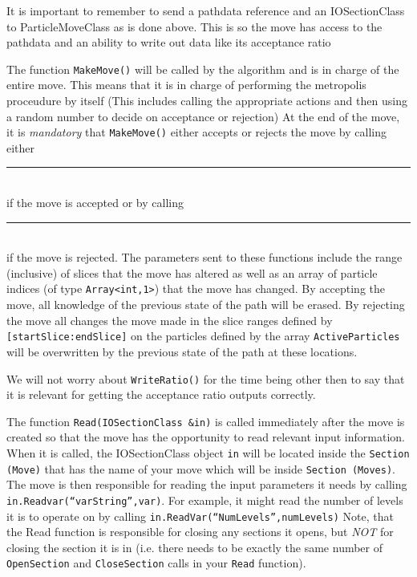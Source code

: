 \documentclass{book}
\begin{document}
It is important to remember to send a pathdata reference and an
  IOSectionClass to ParticleMoveClass as is done above. This is so the
  move has access to the pathdata and an ability to write out data
  like its acceptance ratio

The function \texttt{MakeMove()} will be called by the algorithm 
and is in charge of the entire move. This means that it is in charge
of performing the metropolis proceudure by itself (This includes calling
the appropriate actions and then using a random number to decide on 
acceptance or rejection)
At the end of the move, it is {\em mandatory} that \texttt{MakeMove()} 
either accepts or
rejects the move by calling either \\
\rule{0.6cm}{0cm}\\
if the move is accepted or by calling\\
\rule{0.6cm}{0cm}\\
 if the move is rejected.  
The parameters sent to these functions
include the range (inclusive) of slices that the move has altered as
well as an array of particle indices 
(of type  \texttt{Array<int,1>}) that the move has changed.  
By accepting the move, all knowledge of the previous state of the path
will be erased. By rejecting the move all changes the move made in the
slice ranges defined by \texttt{[startSlice:endSlice]} on the particles defined
by the array \texttt{ActiveParticles} will be overwritten by the previous state
of the path at these locations.  


We will not worry about \texttt{WriteRatio()} for the time being other then to
say that it is relevant for getting the acceptance ratio outputs
correctly.

The function \texttt{Read(IOSectionClass \&in)} is called immediately after the
move is created so that the move has the opportunity to read relevant
input information.  When it is called, the IOSectionClass object
\texttt{in} will be located inside the \texttt{Section (Move)} that 
has the name of your move which
will be inside \texttt{Section (Moves)}.
 The move is then responsible for reading the input parameters it needs
by calling \texttt{in.Readvar(``varString'',var)}. For example, it might read the 
number of levels it is to operate on by calling 
\texttt{in.ReadVar(``NumLevels'',numLevels)} Note,
that the Read function is responsible for closing any sections it
opens, but {\em NOT} for closing the section it is in (i.e. there needs to
be exactly the same number of \texttt{OpenSection} and 
\texttt{CloseSection} calls in
your \texttt{Read} function).
\end{document}
